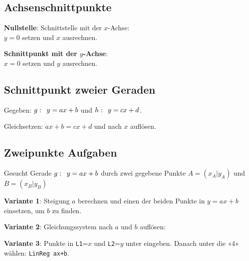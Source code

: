 \begin{multicols}{2}
\subsection*{Achsenschnittpunkte}

\textbf{Nullstelle}: Schnittstelle mit der $x$-Achse:\\
$y=0$ setzen und $x$ ausrechnen.


\textbf{Schnittpunkt mit der $y$-Achse}:\\
$x=0$ setzen und $y$ ausrechnen.


\subsection*{Schnittpunkt zweier Geraden}
Gegeben: $g\-:\,\,\, y=ax+b$ und $h\-:\,\,\, y=cx+d$.

Gleichsetzen: $ax+b = cx+d$ und nach $x$ auflösen.






\subsection*{Zweipunkte Aufgaben}


Gesucht Gerade $g\-: \,\,\, y=ax+b$ durch zwei gegebene Punkte $A=(x_A|y_A)$ und $B=(x_B|y_B)$


\textbf{Variante 1}: Steigung $a$ berechnen und einen der beiden Punkte in
$y=ax+b$ einsetzen, um $b$ zu finden.


\textbf{Variante 2}: Gleichungssystem nach $a$ und $b$ auf\/lösen:

\textbf{Variante 3}: Punkte in \texttt{L1}=$x$ und \texttt{L2}=$y$
unter  eingeben. Danach unter
 die «4» wählen:
\texttt{LinReg ax+b}.

\end{multicols}
\headerUndFooterJedeSeite{}
\newpage
\headerUndFooterJedeSeite{}

